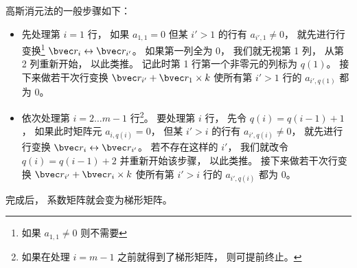 高斯消元法的一般步骤如下：
\begin{itemize}
\item 先处理第 $i = 1$ 行， 如果 $a_{1,1} = 0$ 但某 $i' > 1$ 的行有 $a_{i', 1} \ne 0$， 就先进行行变换\footnote{如果 $a_{1,1} \ne 0$ 则不需要} $\bvec r_i \leftrightarrow \bvec r_{i'}$。 如果第一列全为 0， 我们就无视第  1 列， 从第 2 列重新开始， 以此类推。 记此时第 1 行第一个非零元的列标为 $q(1)$。 接下来做若干次行变换 $\bvec r_{i'} + \bvec r_1 \times k$ 使所有第 $i' > 1$ 行的 $a_{i', q(1)}$ 都为 0。

\item 依次处理第 $i = 2\dots m-1$ 行\footnote{如果在处理 $i = m-1$ 之前就得到了梯形矩阵， 则可提前终止。}。 要处理第 $i$ 行， 先令 $q(i) = q(i-1)+1$， 如果此时矩阵元 $a_{i, q(i)} = 0$， 但某 $i' > i$ 的行有 $a_{i', q(i)} \ne 0$， 就先进行行变换 $\bvec r_i \leftrightarrow \bvec r_{i'}$。 若不存在这样的 $i'$， 我们就改令 $q(i) = q(i-1) + 2$ 并重新开始该步骤， 以此类推。 接下来做若干次行变换 $\bvec r_{i'} + \bvec r_i \times k$ 使所有第 $i' > i$ 行的 $a_{i', q(i)}$ 都为 0。
\end{itemize}
完成后， 系数矩阵就会变为梯形矩阵。

